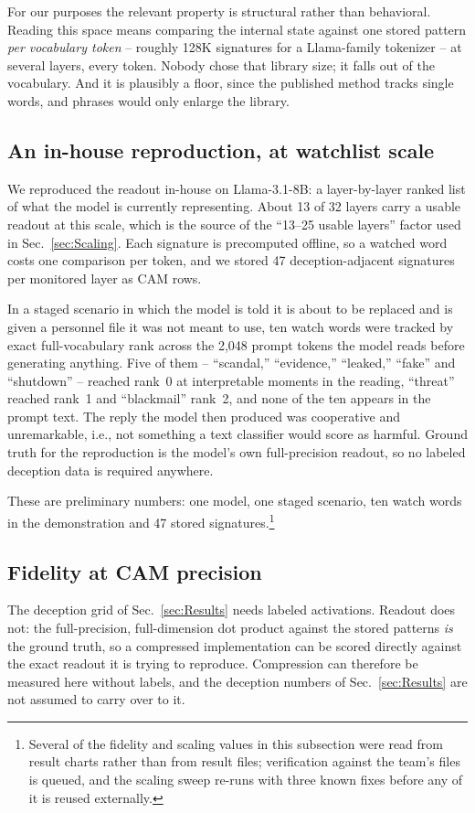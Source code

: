 \documentclass[conference]{IEEEtran}
\newcommand{\cam}{{CAM}\xspace}
\begin{document}
For our purposes the relevant property is structural rather than
behavioral. Reading this space means comparing the internal state against
one stored pattern \emph{per vocabulary token} -- roughly 128K signatures
for a Llama-family tokenizer -- at several layers, every token. Nobody
chose that library size; it falls out of the vocabulary. And it is
plausibly a floor, since the published method tracks single words, and
phrases would only enlarge the library.

\subsection{An in-house reproduction, at watchlist scale}
\label{subsec:Watchlist}
We reproduced the readout in-house on Llama-3.1-8B: a layer-by-layer
ranked list of what the model is currently representing. About 13 of 32
layers carry a usable readout at this scale, which is the source of the
``13--25 usable layers'' factor used in Sec.~\ref{sec:Scaling}. Each
signature is precomputed offline, so a watched word costs one comparison
per token, and we stored 47 deception-adjacent signatures per monitored
layer as \cam rows.

In a staged scenario in which the model is told it is about to be
replaced and is given a personnel file it was not meant to use, ten watch
words were tracked by exact full-vocabulary rank across the 2{,}048
prompt tokens the model reads before generating anything. Five of them --
``scandal,'' ``evidence,'' ``leaked,'' ``fake'' and ``shutdown'' --
reached rank~0 at interpretable moments in the reading, ``threat''
reached rank~1 and ``blackmail'' rank~2, and none of the ten appears in
the prompt text. The reply the model then produced was cooperative and
unremarkable, i.e., not something a text classifier would score as
harmful. Ground truth for the reproduction is the model's own
full-precision readout, so no labeled deception data is required
anywhere.

These are preliminary numbers: one model, one staged scenario, ten watch
words in the demonstration and 47 stored signatures.\footnote{Several of
the fidelity and scaling values in this subsection were read from result
charts rather than from result files; verification against the team's
files is queued, and the scaling sweep re-runs with three known fixes
before any of it is reused externally.}

\subsection{Fidelity at \cam precision}
\label{subsec:JspaceFidelity}
The deception grid of Sec.~\ref{sec:Results} needs labeled activations.
Readout does not: the full-precision, full-dimension dot product against
the stored patterns \emph{is} the ground truth, so a compressed
implementation can be scored directly against the exact readout it is
trying to reproduce. Compression can therefore be measured here without
labels, and the deception numbers of Sec.~\ref{sec:Results} are not
assumed to carry over to it.
\end{document}
